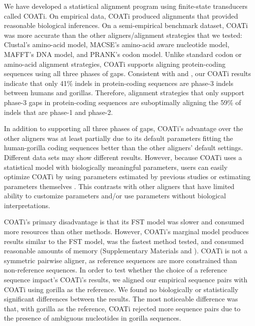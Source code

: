 \documentclass[12pt,letterpaper]{article}
\begin{document}
We have developed a statistical alignment program using finite-state transducers called COATi. On empirical data, COATi produced alignments that provided reasonable biological inferences. On a semi-empirical benchmark dataset, COATi was more accurate than the other aligners/alignment strategies that we tested: Clustal\textOmega{}'s amino-acid model, MACSE's amino-acid aware nucleotide model, MAFFT's DNA model, and PRANK's codon model. Unlike standard codon or amino-acid alignment strategies, COATi supports aligning protein-coding sequences using all three phases of gaps. Consistent with \cite{taylor2004occurrence} and \cite{zhu2022profiling}, our COATi results indicate that only 41\% indels in protein-coding sequences are phase-3 indels between humans and gorillas. Therefore, alignment strategies that only support phase-3 gaps in protein-coding sequences are suboptimally aligning the 59\% of indels that are phase-1 and phase-2.

In addition to supporting all three phases of gaps, COATi's advantage over the other aligners was at least partially due to its default parameters fitting the human-gorilla coding sequences better than the other aligners' default settings. Different data sets may show different results. However, because COATi uses a statistical model with biologically meaningful parameters, users can easily optimize COATi by using parameters estimated by previous studies or estimating parameters themselves \citep[e.g.][]{zhu2022profiling}. This contrasts with other aligners that have limited ability to customize parameters and/or use parameters without biological interpretations.

COATi's primary disadvantage is that its FST model was slower and consumed more resources than other methods. However, COATi's marginal model produces results similar to the FST model, was the fastest method tested, and consumed reasonable amounts of memory (Supplementary Materials and \citealt{garcia2023dissertation}).
%
COATi is not a symmetric pairwise aligner, as reference sequences are more constrained than non-reference sequences. In order to test whether the choice of a reference sequence impact's COATi's results, we aligned our empirical sequence pairs with COATi using gorilla as the reference. We found no biologically or statistically significant differences between the results. The most noticeable difference was that, with gorilla as the reference, COATi rejected more sequence pairs due to the presence of ambiguous nucleotides in gorilla sequences.
\end{document}

